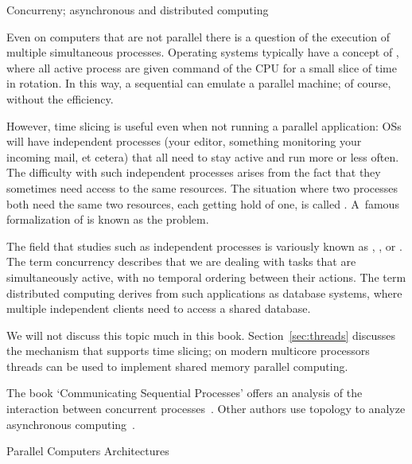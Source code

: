 
 {Concurreny; asynchronous and distributed computing}

Even on computers that are not parallel there is a question of the
execution of multiple simultaneous processes. Operating systems
typically have a concept of , where all active
process are given command of the \ac{CPU} for a small slice of time in
rotation. In this way, a sequential can emulate a parallel machine; of
course, without the efficiency.

However, time slicing is useful even when not running a parallel
application: \acp{OS} will have independent processes (your editor,
something monitoring your incoming mail, et cetera) that all need to
stay active and run more or less often. The difficulty with such
independent processes arises from the fact that they sometimes need
access to the same resources. The situation where two processes both
need the same two resources, each getting hold of one, is called
. A~famous formalization of
 is
known as the  problem.

The field that studies such as independent processes is variously
known as
,
, or
.
The term concurrency describes that we are dealing with tasks that are
simultaneously active, with no temporal ordering between their actions.
The term distributed computing derives from
such applications as database systems, where multiple independent clients need to
access a shared database. 

We will not discuss this topic much in this
book. Section~\ref{sec:threads} discusses the 
mechanism that supports time slicing; on modern multicore processors
threads can be used to implement shared memory parallel computing.

The book `Communicating Sequential
Processes' offers an analysis of the interaction between
concurrent processes~\cite{Hoare:CSP}. Other authors use topology to analyze
asynchronous computing~\cite{Herlihy:1999:topological}.

 {Parallel Computers Architectures}

